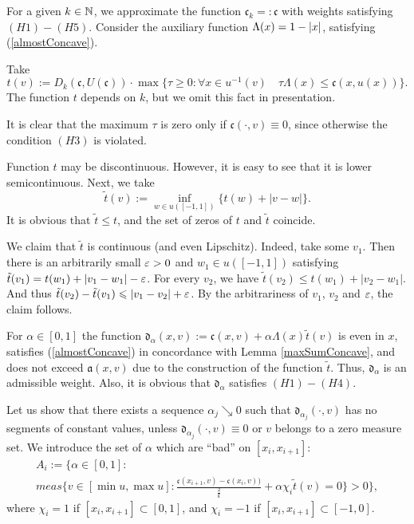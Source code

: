 For a given $k \in \mathbb N$, we approximate the function $\mathfrak c_k =: \mathfrak c$ with weights satisfying $(H1)-(H5)$.
Consider the auxiliary function $\Lambda(x) = 1 - \left\vert x\right\vert$, satisfying (\ref{almostConcave}).

Take
$$t(v):=D_k(\mathfrak c, U(\mathfrak c)) \cdot \max\{\tau \ge 0: \forall x \in u^{-1}(v) \quad \tau \Lambda(x) \le \mathfrak c(x, u(x))\}.$$
The function $t$ depends on $k$, but we omit this fact in presentation.

It is clear that the maximum $\tau$ is zero only if $\mathfrak c(\cdot, v) \equiv 0$,
since otherwise the condition $(H3)$ is violated.

Function $t$ may be discontinuous. However, it is easy to see that it is lower semicontinuous.
Next, we take
$$\tilde{t}(v) := \inf_{w \in u([-1, 1])} \{t(w) + |v - w|\}.$$
It is obvious that $\tilde{t} \le t$, and the set of zeros of $t$ and $\tilde{t}$ coincide.

We claim that $\tilde{t}$ is continuous (and even Lipschitz).
Indeed, take some $v_1$.
Then there is an arbitrarily small $\varepsilon > 0$ and $w_1 \in u([-1, 1])$
satisfying $\tilde{t}(v_1) = t(w_1) + |v_1 - w_1| - \varepsilon$.
For every $v_2$, we have $\tilde{t}(v_2) \le t(w_1) + |v_2 - w_1|$.
And thus $\tilde{t}(v_2) - \tilde{t}(v_1) \leqslant |v_1 - v_2| + \varepsilon$.
By the arbitrariness of $v_1$, $v_2$ and $\varepsilon$, the claim follows.

For $\alpha \in [0, 1]$ the function $\mathfrak d_\alpha(x, v) := \mathfrak c(x, v) + \alpha \Lambda(x) \tilde{t}(v)$
is even in $x$, satisfies (\ref{almostConcave}) in concordance with Lemma \ref{maxSumConcave},
and does not exceed $\mathfrak a(x, v)$ due to the construction of the function $\tilde{t}$.
Thus, $\mathfrak d_\alpha$ is an admissible weight.
Also, it is obvious that $\mathfrak d_\alpha$ satisfies $(H1)-(H4)$.

Let us show that there exists a sequence $\alpha_j \searrow 0$
such that $\mathfrak d_{\alpha_j}(\cdot, v)$ has no segments of constant values,
unless $\mathfrak d_{\alpha_j}(\cdot, v) \equiv 0$ or $v$ belongs to a zero measure set.
We introduce the set of $\alpha$ which are ``bad'' on $[x_i, x_{i + 1}]$:
\begin{multline*}
A_i := \big \{\alpha \in [0, 1]: \\
meas \{v \in [\min u, \max u]: \frac{\mathfrak c(x_{i + 1}, v) - \mathfrak c(x_i, v))}{\frac{2}{k}} + \alpha \chi_i \tilde{t} (v) = 0 \} > 0 \big \},
\end{multline*}
where $\chi_i = 1$ if $[x_i, x_{i + 1}] \subset [0, 1]$, and $\chi_i = -1$ if $[x_i, x_{i + 1}] \subset [-1, 0]$.

